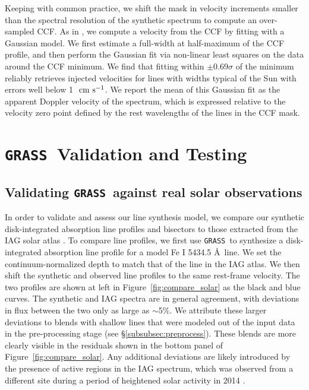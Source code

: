 \documentclass[twocolumn]{aastex63}
\newcommand{\cms}{\ {\rm cm\ s}^{-1}}
\newcommand{\grass}{\texttt{GRASS}}
\begin{document}
Keeping with common practice, we shift the mask in velocity increments smaller than the spectral resolution of the synthetic spectrum to compute an over-sampled CCF. As in \citet{Pepe2002}, we compute a velocity from the CCF by fitting with a Gaussian model. We first estimate a full-width at half-maximum of the CCF profile, and then perform the Gaussian fit via non-linear least squares on the data around the CCF minimum. We find that fitting within $\pm$0.69$\sigma$ of the minimum reliably retrieves injected velocities for lines with widths typical of the Sun with errors well below 1 $\cms$. We report the mean of this Gaussian fit as the apparent Doppler velocity of the spectrum, which is expressed relative to the velocity zero point defined by the rest wavelengths of the lines in the CCF mask. \par 

\section{\grass\ Validation and Testing} \label{validation}

\subsection{Validating \grass\ against real solar observations} \label{subsec:compare_solar}

In order to validate and assess our line synthesis model, we compare our synthetic disk-integrated absorption line profiles and bisectors to those extracted from the IAG solar atlas \citep{Reiners2016}. To compare line profiles, we first use \grass\ to synthesize a disk-integrated absorption line profile for a model Fe \textsc{I} 5434.5 \AA\ line. We set the continuum-normalized depth to match that of the line in the IAG atlas. We then shift the synthetic and observed line profiles to the same rest-frame velocity. The two profiles are shown at left in Figure~\ref{fig:compare_solar} as the black and blue curves. The synthetic and IAG spectra are in general agreement, with deviations in flux between the two only as large as $\sim$5$\%$. We attribute these larger deviations to blends with shallow lines that were modeled out of the input data in the pre-processing stage (see \S\ref{subsubsec:preprocess}). These blends are more clearly visible in the residuals shown in the bottom panel of Figure~\ref{fig:compare_solar}. Any additional deviations are likely introduced by the presence of active regions in the IAG spectrum, which was observed from a different site during a period of heightened solar activity in 2014 \citep{Hathaway2015, Reiners2016}.  \par 
\end{document}
